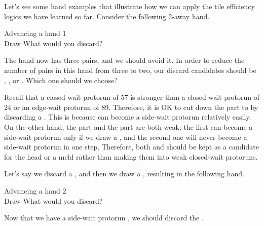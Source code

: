 Let's see some hand examples that illustrate how we can apply the tile efficiency logics we have learned so far. Consider the following 2-away hand. 
\begin{itembox}[r]{Advancing a hand 1}
\bp
{}~\\
\hspace{290pt}\footnotesize{Draw}
\ep
\vspace{-17pt}What would you discard? \vspace{-5pt}
\end{itembox}
\noindent
The hand now has three pairs, and we should avoid it. In order to reduce the number of pairs in this hand from three to two, our discard candidates should be {\large{}}, {\large{}}, or {\large{}}. Which one should we choose? 

\bigskip
Recall that a closed-wait protorun of 57 is stronger than a closed-wait protorun of 24 or an edge-wait protorun of 89. Therefore, it is OK to cut down the {\large{}} part to {\large{}} by discarding a {\large{}}. This is because {\large{}} can become a side-wait protorun relatively easily. On the other hand, the {\large{}} part and the {\large{}} part are both weak; the first can become a side-wait protorun only if we draw a {\large{}}, and the second one will never become a side-wait protorun in one step. Therefore, both {\large{}} and {\large{}} should be kept as a candidate for the head or a meld rather than making them into weak closed-wait protoruns.

\bigskip
Let's say we discard a {\large{}}, and then we draw a {\large{}}, resulting in the following hand. 
\begin{itembox}[r]{Advancing a hand 2}
\bp
{}~\\
\hspace{290pt}\footnotesize{Draw}
\ep
\vspace{-17pt}What would you discard? \vspace{-5pt}
\end{itembox}
\noindent
Now that we have a side-wait protorun {\large{}}, we should discard the {\large{}}. 


